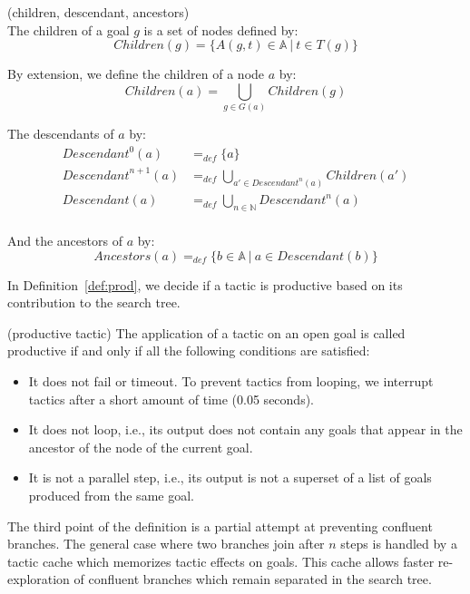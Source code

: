 \documentclass[runningheads,a4paper,draft]{svjour3}
\begin{document}
\begin{definition}\label{def:desc}(children, descendant, ancestors)\\
The children of a goal $g$ is a set of nodes defined by:
\[\mathit{Children}(g) = \lbrace A(g,t)\in \mathbb{A}\ |\ t \in T(g) \rbrace\]

By extension, we define the children of a node $a$ by:
\[\mathit{Children}(a) = \bigcup_{g \in G(a)} \mathit{Children}(g) \]

The descendants of $a$ by:
\begin{align*}
\mathit{Descendant}^{0}(a) &=_{def} \lbrace a \rbrace \\
\mathit{Descendant}^{n+1}(a) &=_{def} \bigcup_{a' \in \mathit{Descendant}^{n}(a)}
\mathit{Children}(a') \\
\mathit{Descendant}(a) &=_{def} \bigcup_{n \in \mathbb{N}} \mathit{Descendant}^n(a)\\
\end{align*}

And the ancestors of $a$ by:
\[\mathit{Ancestors}(a) =_{def} \lbrace b \in \mathbb{A} \ | \ a \in
Descendant(b) \rbrace\]

\end{definition}


In Definition~\ref{def:prod}, we decide if a tactic is productive based on its
contribution to the search tree.

\begin{definition}\label{def:prod} (productive tactic)
The application of a tactic on an open goal is called productive if and only if
all the following conditions are satisfied:
\begin{itemize}
\item It does not fail or timeout. To prevent tactics from looping, we
interrupt tactics after a short amount of time (0.05 seconds).
\item It does not loop, i.e., its output does not contain any goals that appear
in the ancestor of the node of the current goal.
\item It is not a parallel step, i.e., its output is not a superset
of a list of goals produced from the same goal.
\end{itemize}

The third point of the definition is a partial attempt at preventing confluent
branches. The general case where two branches join after $n$ steps is handled
by a tactic cache which memorizes tactic effects on goals. This
cache allows faster re-exploration of confluent branches which remain
separated in the search tree.
\end{definition}
\end{document}
